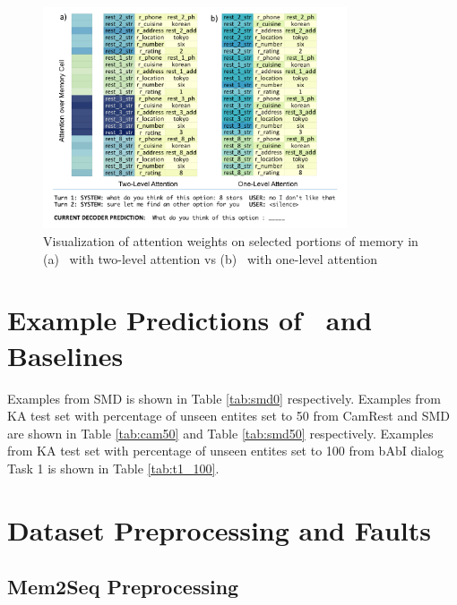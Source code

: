 \begin{figure}
\centering
\includegraphics[width=0.8\textwidth]{assets/task3_two_level.png}
\caption{Visualization of attention weights on selected portions of memory in (a) \sys\ with two-level attention vs (b) \sys\ with one-level attention}
\label{fig:attention}
\end{figure}

\section{Example Predictions of \sys\ and Baselines}
\label{sec:examples}
Examples from SMD is shown in Table \ref{tab:smd0} respectively. Examples from KA test set with percentage of unseen entites set to 50 from CamRest and SMD are shown in Table \ref{tab:cam50} and Table \ref{tab:smd50} respectively. Examples from KA test set with percentage of unseen entites set to 100 from bAbI dialog Task 1 is shown in Table \ref{tab:t1_100}.





\section{Dataset Preprocessing and Faults}
\label{sec:preprocess}
\subsection{Mem2Seq Preprocessing}
\label{sec:prep_mem}

